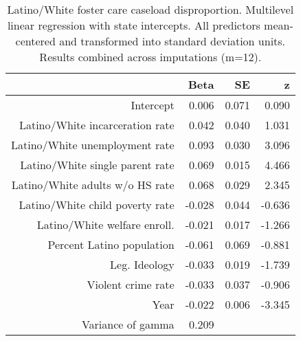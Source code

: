 \begin{table}[ht]
\centering
\caption{Latino/White foster care caseload disproportion. Multilevel linear regression with state intercepts. 
             All predictors mean-centered and transformed into standard deviation units.
             Results combined across imputations (m=12).} 
\label{l.c.tab}
\begin{tabular}{rrrr}
  \hline
 & Beta & SE & z \\ 
  \hline
Intercept & 0.006 & 0.071 & 0.090 \\ 
  Latino/White incarceration rate & 0.042 & 0.040 & 1.031 \\ 
  Latino/White unemployment rate & 0.093 & 0.030 & 3.096 \\ 
  Latino/White single parent rate & 0.069 & 0.015 & 4.466 \\ 
  Latino/White adults w/o HS rate & 0.068 & 0.029 & 2.345 \\ 
  Latino/White child poverty rate & -0.028 & 0.044 & -0.636 \\ 
  Latino/White welfare enroll.  & -0.021 & 0.017 & -1.266 \\ 
  Percent Latino population & -0.061 & 0.069 & -0.881 \\ 
  Leg. Ideology & -0.033 & 0.019 & -1.739 \\ 
  Violent crime rate & -0.033 & 0.037 & -0.906 \\ 
  Year & -0.022 & 0.006 & -3.345 \\ 
  Variance of gamma & 0.209 &  &  \\ 
   \hline
\end{tabular}
\end{table}
